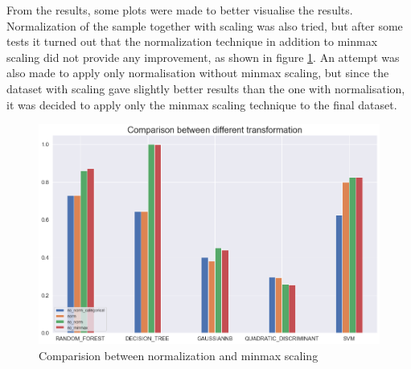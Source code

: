 \documentclass[../main]{subfiles}
\begin{document}
From the results, some plots were made to better visualise the results.
Normalization of the sample together with scaling was also tried, but after some tests it turned out that the normalization technique in addition to minmax scaling did not provide any improvement, as shown in figure \ref{fig:data_transformation}.
An attempt was also made to apply only normalisation without minmax scaling, but since the dataset with scaling gave slightly better results than the one with normalisation, it was decided to apply only the minmax scaling technique to the final dataset.

\begin{figure}[h]
    \begin{center}
        \includegraphics[width=0.5\linewidth]{figures/data_transformation.png}
    \end{center}
    
    \caption{Comparision between normalization and minmax scaling}
    \label{fig:data_transformation}
\end{figure}
\end{document}
